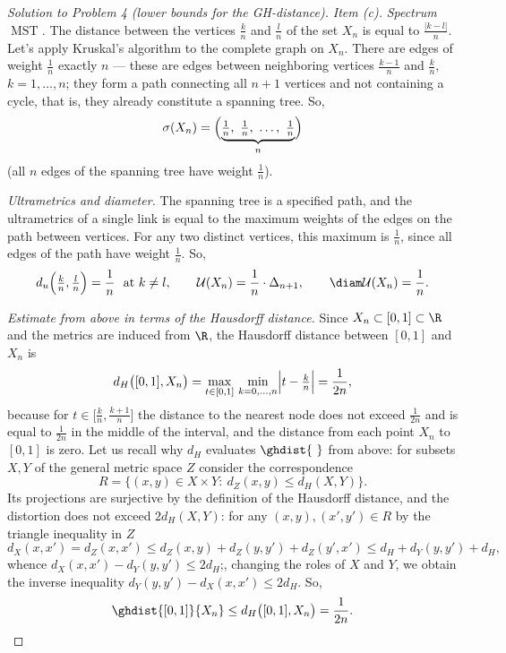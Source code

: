 \documentclass[a4paper,12pt]{report}
\begin{document}
\begin{proof}[Solution to Problem \textup{4} \textup{(}lower bounds for the GH-distance\textup{)}]
\textit{Item \textup{(c)}.} \textit{Spectrum $\operatorname{MST}$.} The distance between the vertices $\frac{k}{n}$ and $\frac{l}{n}$ of the set $X_n$ is equal to $\frac{|k-l|}{n}$. Let's apply Kruskal's algorithm to the complete graph on $X_n$. There are edges of weight $\frac1n$ exactly $n$ --- these are edges between neighboring vertices $\frac{k-1}{n}$ and $\frac{k}{n}$, $k=1,\dots,n$\textup{;} they form a path connecting all $n+1$ vertices and not containing a cycle, that is, they already constitute a spanning tree. So,
\[
\sigma(X_n)=\Bigl(\underbrace{\tfrac1n,\ \tfrac1n,\ \dots,\ \tfrac1n}_{n}\Bigr)
\]
\textup{(}all $n$ edges of the spanning tree have weight $\frac1n$\textup{)}.

\textit{Ultrametrics and diameter.} The spanning tree is a specified path, and the ultrametrics of a single link is equal to the maximum weights of the edges on the path between vertices. For any two distinct vertices, this maximum is $\frac1n$, since all edges of the path have weight $\frac1n$. So,
\[
d_u\Bigl(\tfrac{k}{n},\tfrac{l}{n}\Bigr)=\frac1n\ \ \text{at}\ k\ne l,\qquad \mathcal U(X_n)=\frac1n\cdot\Delta_{n+1},\qquad \diam\mathcal U(X_n)=\frac1n .
\]

\textit{Estimate from above in terms of the Hausdorff distance.} Since $X_n\subset[0,1]\subset\R$ and the metrics are induced from $\R$, the Hausdorff distance between $[0,1]$ and $X_n$ is
\[
d_H\bigl([0,1],X_n\bigr)=\max_{t\in[0,1]}\,\min_{k=0,\dots,n}\Bigl|t-\tfrac{k}{n}\Bigr|=\frac{1}{2n} ,
\]
because for $t\in\bigl[\frac{k}{n},\frac{k+1}{n}\bigr]$ the distance to the nearest node does not exceed $\frac{1}{2n}$ and is equal to $\frac{1}{2n}$ in the middle of the interval, and the distance from each point $X_n$ to $[0,1]$ is zero. Let us recall why $d_H$ evaluates $\ghdist{\ }$ from above\textup{:} for subsets $X,Y$ of the general metric space $Z$ consider the correspondence
\[
R=\bigl\{(x,y)\in X\times Y:\ d_Z(x,y)\le d_H(X,Y)\bigr\} .
\]
Its projections are surjective by the definition of the Hausdorff distance, and the distortion does not exceed $2d_H(X,Y)$\textup{:} for any $(x,y),(x',y')\in R$ by the triangle inequality in $Z$
\[
d_X(x,x')=d_Z(x,x')\le d_Z(x,y)+d_Z(y,y')+d_Z(y',x')\le d_H+d_Y(y,y')+d_H ,
\]
whence $d_X(x,x')-d_Y(y,y')\le 2d_H$\textup{;}, changing the roles of $X$ and $Y$, we obtain the inverse inequality $d_Y(y,y')-d_X(x,x')\le2d_H$. So,
\[
\ghdist{[0,1]}{X_n}\le d_H\bigl([0,1],X_n\bigr)=\frac{1}{2n} .
\]


\end{proof}
\end{document}
